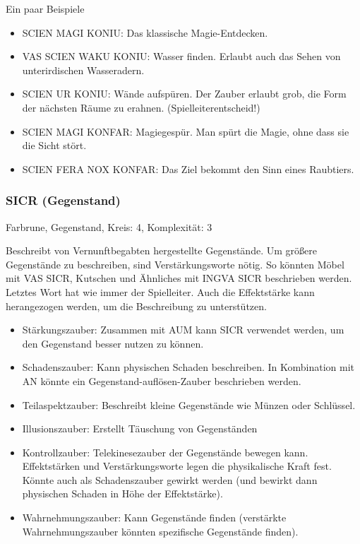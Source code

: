 \documentclass{article}
\begin{document}
Ein paar Beispiele

\begin{itemize}
\item SCIEN MAGI KONIU: Das klassische Magie-Entdecken.
\item VAS SCIEN WAKU KONIU: Wasser finden. Erlaubt auch das Sehen von unterirdischen Wasseradern.
\item SCIEN UR KONIU: Wände aufspüren. Der Zauber erlaubt grob, die Form der nächsten Räume zu erahnen. (Spielleiterentscheid!)
\item SCIEN MAGI KONFAR: Magiegespür. Man spürt die Magie, ohne dass sie die Sicht stört.
\item SCIEN FERA NOX KONFAR: Das Ziel bekommt den Sinn eines Raubtiers.
\end{itemize}

\subsubsection{SICR (Gegenstand)}

Farbrune, Gegenstand, Kreis: 4, Komplexität: 3

Beschreibt von Vernunftbegabten hergestellte Gegenstände. Um größere Gegenstände zu beschreiben, sind
Verstärkungsworte nötig. So könnten Möbel mit VAS SICR, Kutschen und Ähnliches mit INGVA SICR beschrieben werden.
Letztes Wort hat wie immer der Spielleiter. Auch die Effektstärke kann herangezogen werden, um die Beschreibung zu
unterstützen.

\begin{itemize}
\item Stärkungszauber: Zusammen mit AUM kann SICR verwendet werden, um den Gegenstand besser nutzen zu können.
\item Schadenszauber: Kann physischen Schaden beschreiben. In Kombination mit AN könnte ein Gegenstand-auflösen-Zauber beschrieben werden.
\item Teilaspektzauber: Beschreibt kleine Gegenstände wie Münzen oder Schlüssel.
\item Illusionszauber: Erstellt Täuschung von Gegenständen
\item Kontrollzauber: Telekinesezauber der Gegenstände bewegen kann. Effektstärken und Verstärkungsworte legen die physikalische Kraft fest. Könnte auch als Schadenszauber gewirkt werden (und bewirkt dann physischen Schaden in Höhe der Effektstärke).
\item Wahrnehmungszauber: Kann Gegenstände finden (verstärkte Wahrnehmungszauber könnten spezifische Gegenstände finden).
\end{itemize}
\end{document}
